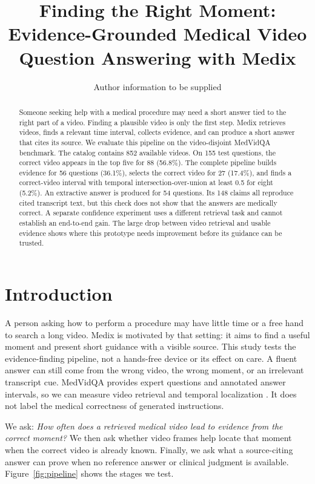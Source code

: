 \documentclass[sigconf,authorversion,nonacm]{acmart}
\title{Finding the Right Moment: Evidence-Grounded Medical Video Question Answering with Medix}
\author{Author information to be supplied}
\begin{document}
\begin{abstract}
Someone seeking help with a medical procedure may need a short answer tied to the right part of a video. Finding a plausible video is only the first step. Medix retrieves videos, finds a relevant time interval, collects evidence, and can produce a short answer that cites its source. We evaluate this pipeline on the video-disjoint MedVidQA benchmark. The catalog contains 852 available videos. On 155 test questions, the correct video appears in the top five for 88 (56.8\%). The complete pipeline builds evidence for 56 questions (36.1\%), selects the correct video for 27 (17.4\%), and finds a correct-video interval with temporal intersection-over-union at least 0.5 for eight (5.2\%). An extractive answer is produced for 54 questions. Its 148 claims all reproduce cited transcript text, but this check does not show that the answers are medically correct. A separate confidence experiment uses a different retrieval task and cannot establish an end-to-end gain. The large drop between video retrieval and usable evidence shows where this prototype needs improvement before its guidance can be trusted.
\end{abstract}

\maketitle

\section{Introduction}
A person asking how to perform a procedure may have little time or a free hand to search a long video. Medix is motivated by that setting: it aims to find a useful moment and present short guidance with a visible source. This study tests the evidence-finding pipeline, not a hands-free device or its effect on care. A fluent answer can still come from the wrong video, the wrong moment, or an irrelevant transcript cue. MedVidQA provides expert questions and annotated answer intervals, so we can measure video retrieval and temporal localization \cite{gupta2023medvidqa}. It does not label the medical correctness of generated instructions.

We ask: \emph{How often does a retrieved medical video lead to evidence from the correct moment?} We then ask whether video frames help locate that moment when the correct video is already known. Finally, we ask what a source-citing answer can prove when no reference answer or clinical judgment is available. Figure~\ref{fig:pipeline} shows the stages we test.
\end{document}
